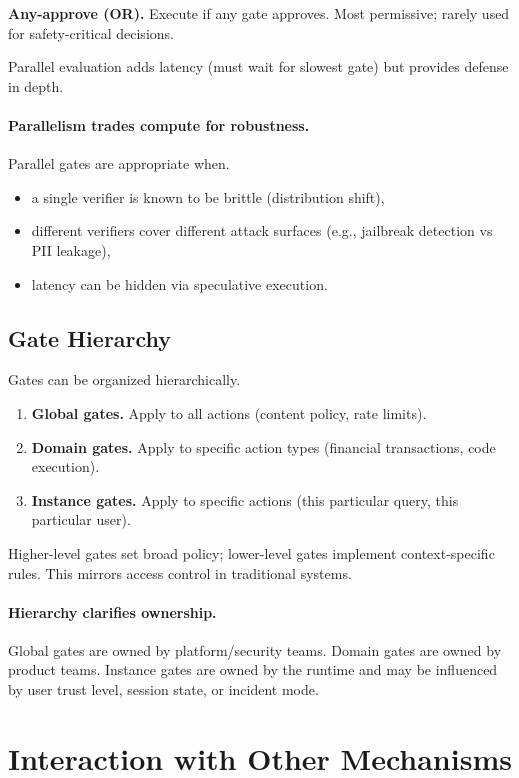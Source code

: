 \textbf{Any-approve (OR).} Execute if any gate approves. Most permissive; rarely used for safety-critical decisions.

Parallel evaluation adds latency (must wait for slowest gate) but provides defense in depth.

\paragraph{Parallelism trades compute for robustness.}
Parallel gates are appropriate when.
\begin{itemize}
\item a single verifier is known to be brittle (distribution shift),
\item different verifiers cover different attack surfaces (e.g., jailbreak detection vs PII leakage),
\item latency can be hidden via speculative execution.
\end{itemize}

\subsection{Gate Hierarchy}

Gates can be organized hierarchically.

\begin{enumerate}
\item \textbf{Global gates.} Apply to all actions (content policy, rate limits).
\item \textbf{Domain gates.} Apply to specific action types (financial transactions, code execution).
\item \textbf{Instance gates.} Apply to specific actions (this particular query, this particular user).
\end{enumerate}

Higher-level gates set broad policy; lower-level gates implement context-specific rules. This mirrors access control in traditional systems.

\paragraph{Hierarchy clarifies ownership.}
Global gates are owned by platform/security teams. Domain gates are owned by product teams. Instance gates are owned by the runtime and may be influenced by user trust level, session state, or incident mode.

\section{Interaction with Other Mechanisms}

